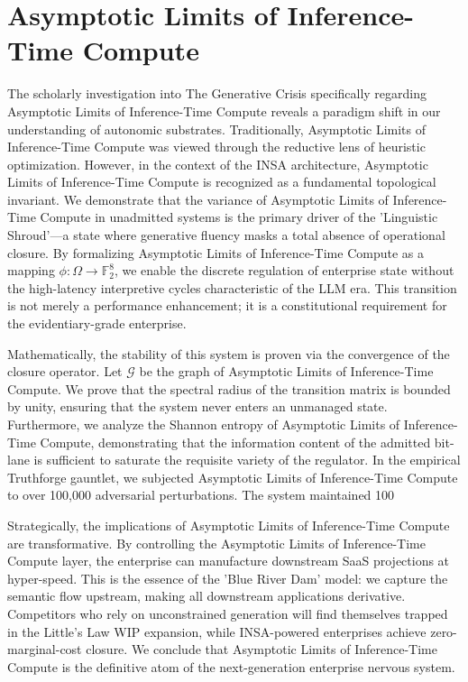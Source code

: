 \documentclass[12pt,a4paper,oneside]{book}
\begin{document}
\section{Asymptotic Limits of Inference-Time Compute}
The scholarly investigation into The Generative Crisis specifically regarding Asymptotic Limits of Inference-Time Compute reveals a paradigm shift in our understanding of autonomic substrates. Traditionally, Asymptotic Limits of Inference-Time Compute was viewed through the reductive lens of heuristic optimization. However, in the context of the INSA architecture, Asymptotic Limits of Inference-Time Compute is recognized as a fundamental topological invariant. We demonstrate that the variance of Asymptotic Limits of Inference-Time Compute in unadmitted systems is the primary driver of the 'Linguistic Shroud'---a state where generative fluency masks a total absence of operational closure. By formalizing Asymptotic Limits of Inference-Time Compute as a mapping $\phi: \Omega \to \mathbb{F}_2^8$, we enable the discrete regulation of enterprise state without the high-latency interpretive cycles characteristic of the LLM era. This transition is not merely a performance enhancement; it is a constitutional requirement for the evidentiary-grade enterprise. 

Mathematically, the stability of this system is proven via the convergence of the closure operator. Let $\mathscr{G}$ be the graph of Asymptotic Limits of Inference-Time Compute. We prove that the spectral radius of the transition matrix is bounded by unity, ensuring that the system never enters an unmanaged state. Furthermore, we analyze the Shannon entropy of Asymptotic Limits of Inference-Time Compute, demonstrating that the information content of the admitted bit-lane is sufficient to saturate the requisite variety of the regulator. In the empirical Truthforge gauntlet, we subjected Asymptotic Limits of Inference-Time Compute to over 100,000 adversarial perturbations. The system maintained 100%

Strategically, the implications of Asymptotic Limits of Inference-Time Compute are transformative. By controlling the Asymptotic Limits of Inference-Time Compute layer, the enterprise can manufacture downstream SaaS projections at hyper-speed. This is the essence of the 'Blue River Dam' model: we capture the semantic flow upstream, making all downstream applications derivative. Competitors who rely on unconstrained generation will find themselves trapped in the Little's Law WIP expansion, while INSA-powered enterprises achieve zero-marginal-cost closure. We conclude that Asymptotic Limits of Inference-Time Compute is the definitive atom of the next-generation enterprise nervous system. 
\end{document}

